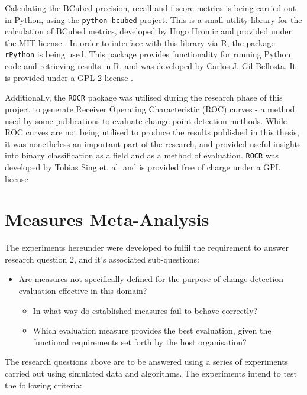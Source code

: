 \documentclass{uvamscse}	%
\begin{document}
Calculating the BCubed precision, recall and f-score metrics is being carried out in Python, using the \texttt{python-bcubed} project. This is a small utility library for the calculation of BCubed metrics, developed by Hugo Hromic and provided under the MIT license \cite{Hromic2016}. In order to interface with this library via \textsf{R}, the package \texttt{rPython} is being used. This package provides functionality for running Python code and retrieving results in \textsf{R}, and was developed by Carlos J. Gil Bellosta. It is provided under a GPL-2 license \cite{Bellosta2015}.

Additionally, the \texttt{ROCR} package was utilised during the research phase of this project to generate Receiver Operating Characteristic (ROC) curves - a method used by some publications to evaluate change point detection methods. While ROC curves are not being utilised to produce the results published in this thesis, it was nonetheless an important part of the research, and provided useful insights into binary classification as a field and as a method of evaluation. \texttt{ROCR} was developed by Tobias Sing et. al. and is provided free of charge under a GPL license \cite{Sing2005}

\section{Measures Meta-Analysis}
\label{meta analysis explainer}

The experiments hereunder were developed to fulfil the requirement to answer research question 2, and it's associated sub-questions:

\begin{itemize}
    \item Are measures not specifically defined for the purpose of change detection evaluation effective in this domain?
    \begin{itemize}
        \item In what way do established measures fail to behave correctly?
        \item Which evaluation measure provides the best evaluation, given the functional requirements set forth by the host organisation?
    \end{itemize}
\end{itemize}

The research questions above are to be answered using a series of experiments carried out using simulated data and algorithms. The experiments intend to test the following criteria:
\end{document}

